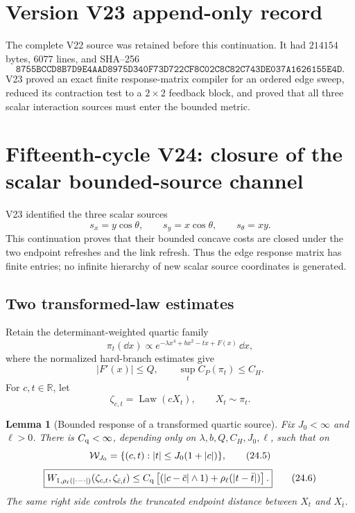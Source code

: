 \documentclass[11pt]{article}
\newtheorem{lemma}[theorem]{Lemma}
\theoremstyle{remark}
\begin{document}
\section*{Version V23 append-only record}
The complete V22 source was retained before this continuation.  It
had \(214154\) bytes, \(6077\) lines, and SHA--256
\[
 \texttt{8755BCCD8B7D9E4AAD8975D340F73D722CF8C02C8C82C743DE037A1626155E4D}.
\]
V23 proved an exact finite response-matrix compiler for an ordered
edge sweep, reduced its contraction test to a \(2\times2\)
feedback block, and proved that all three scalar interaction
sources must enter the bounded metric.
\section{Fifteenth-cycle V24: closure of the scalar bounded-source channel}
\label{sec:v15v24}

V23 identified the three scalar sources
\[
 s_x=y\cos\theta,\qquad
 s_y=x\cos\theta,\qquad
 s_\theta=xy.                                               \tag{24.1}
\]
This continuation proves that their bounded concave costs are closed
under the two endpoint refreshes and the link refresh.  Thus the
edge response matrix has finite entries; no infinite hierarchy of
new scalar source coordinates is generated.

\subsection{Two transformed-law estimates}

Retain the determinant-weighted quartic family
\[
 \pi_t(\dd x)
 \propto e^{-\lambda x^4+bx^2-tx+F(x)}\,\dd x,              \tag{24.2}
\]
where the normalized hard-branch estimates give
\[
 |F'(x)|\le Q,\qquad
 \sup_t C_P(\pi_t)\le C_H.                                  \tag{24.3}
\]
For \(c,t\in\mathbb R\), let
\[
 \zeta_{c,t}=\operatorname{Law}(cX_t),
 \qquad X_t\sim\pi_t.                                       \tag{24.4}
\]

\begin{lemma}[Bounded response of a transformed quartic source]
\label{lem:v15v24-quartic-transform}
Fix \(J_0<\infty\) and \(\ell>0\).  There is
\(C_{\rm q}<\infty\), depending only on
\(\lambda,b,Q,C_H,J_0,\ell\), such that on
\[
 {\cal W}_{J_0}
 =
 \{(c,t):|t|\le J_0(1+|c|)\},                               \tag{24.5}
\]
\[
\boxed{
 W_{1,\rho_\ell(|\cdot-\cdot|)}
 (\zeta_{c,t},\zeta_{\bar c,\bar t})
 \le C_{\rm q}\left[
 (|c-\bar c|\wedge1)+
 \rho_\ell(|t-\bar t|)
 \right].}                                                  \tag{24.6}
\]
The same right side controls the truncated endpoint distance
between \(X_t\) and \(X_{\bar t}\).
\end{lemma}
\end{document}
